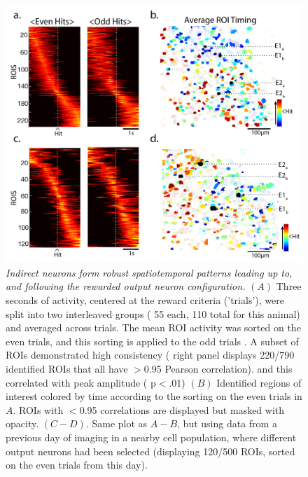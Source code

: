 \documentclass[letterpaper, 10 pt, conference]{ieeeconf}  %
\begin{document}
   \begin{figure}[thpb]
      \centering
      \includegraphics[scale=.50]{figures/figure03.png}
      \caption{\emph{Indirect neurons form robust spatiotemporal patterns leading up to, and following the rewarded output neuron configuration.} $(A)$ Three seconds of activity, centered at the reward criteria ('trials'), were split into two interleaved groups ( 55 each, 110 total for this animal) and averaged across trials. The mean ROI activity was sorted on the even trials, and this sorting is applied to the odd trials . A subset of ROIs demonstrated  high consistency ( right panel displays 220/790 identified ROIs that all have $>$0.95 Pearson correlation). and this correlated with peak amplitude ( p$<$.01)  $(B)$ Identified regions of interest colored by time according to the sorting on the even trials in $A$. ROIs with $<$0.95 correlations are displayed but masked with opacity. $(C-D)$. Same plot as $A-B$, but using data from a previous day of imaging in a nearby cell population, where different output neurons had been selected (displaying 120/500 ROIs, sorted on the even trials from this day).}
      \label{figurelabel}
   \end{figure}
   
\end{document}
